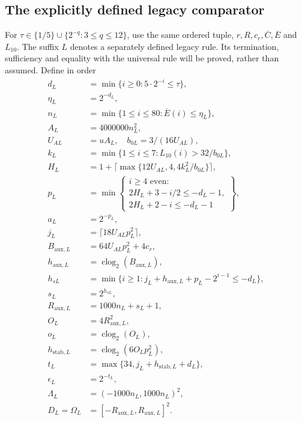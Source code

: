 \subsection{The explicitly defined legacy comparator}
For $\tau\in\{1/5\}\cup\{2^{-q}:3\le q\le12\}$, use the same ordered
tuple, $r,R,c_r,\overline C,\overline E$ and $L_{10}$. The suffix $L$
denotes a separately defined legacy rule. Its termination, sufficiency
and equality with the universal rule will be proved, rather than assumed.
Define in order
\begin{align*}
 d_L&=\min\{i\ge0:5\cdot2^{-i}\le\tau\},\\
 \eta_L&=2^{-d_L},\\
 n_L&=\min\{1\le i\le80:\overline E(i)\le\eta_L\},\\
 A_L&=4000000n_L^2,\\
 U_{AL}&=uA_L,\quad b_{0L}=3/(16U_{AL}),\\
 k_L&=\min\{1\le i\le7:L_{10}(i)>32/b_{0L}\},\\
 H_L&=1+\lceil\max\{12U_{AL},4,4k_L^2/b_{0L}\}\rceil,\\
 p_L&=\min\left\{\begin{array}{l}i\ge4\text{ even}:\\
 2H_L+3-i/2\le-d_L-1,\\
 2H_L+2-i\le-d_L-1\end{array}\right\},
 \\
 a_L&=2^{-p_L},\\
 j_L&=\lceil18U_{AL}p_L^2\rceil,\\
 B_{\mathrm{aux},L}&=64U_{AL}p_L^2+4c_r,\\
 h_{\mathrm{aux},L}&=\operatorname{clog}_2(B_{\mathrm{aux},L}),\\
 h_{sL}&=\min\{i\ge1:j_L+h_{\mathrm{aux},L}+p_L-2^{i-1}\le-d_L\},\\
 s_L&=2^{h_{sL}},\\
 R_{\mathrm{aux},L}&=1000n_L+s_L+1,\\
 O_L&=4R_{\mathrm{aux},L}^2,\\
 o_L&=\operatorname{clog}_2(O_L),\\
 h_{\mathrm{stab},L}&=\operatorname{clog}_2(6O_Lp_L^2),\\
 t_L&=\max\{34,j_L+h_{\mathrm{stab},L}+d_L\},\\
 \epsilon_L&=2^{-t_L},\\
 \Lambda_L&=(-1000n_L,1000n_L)^2,\\
 D_L=\Omega_L&=[-R_{\mathrm{aux},L},R_{\mathrm{aux},L}]^2.
\end{align*}
